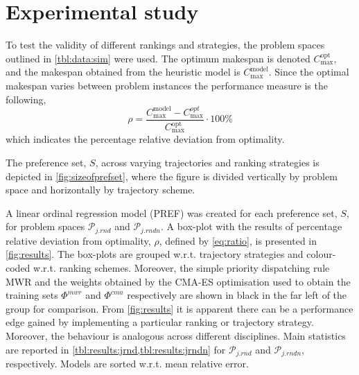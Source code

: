 \documentclass[smallextended]{llncs}
\begin{document}
\section{Experimental study}\label{sec:expr}
To test the validity of different rankings and strategies, the problem spaces outlined in \cref{tbl:data:sim} were used. The optimum makespan is denoted 
$C_{\max}^{\text{opt}}$, and the makespan obtained from the heuristic model is $C_{\max}^{\text{model}}$. Since 
the optimal makespan varies between problem instances the performance measure is the following, 
\begin{equation}\label{eq:ratio}\rho=\frac{C_{\max}^{\text{model}}-C_{\max}^{opt}}{C_{\max}^{\text{opt}}}\cdot 
100\%\end{equation}
which indicates the percentage relative deviation from optimality. 

The preference set, $S$, across varying trajectories and ranking strategies is depicted in \cref{fig:sizeofprefset}, where the figure is divided vertically by problem space and horizontally by trajectory scheme.
 
A linear ordinal regression model (PREF) was created for each preference set, $S$, for problem spaces $\mathcal{P}_{j.rnd}$ and $\mathcal{P}_{j.rndn}$. A box-plot with the results of percentage relative deviation from optimality, $\rho$, defined by \cref{eq:ratio}, is presented in \cref{fig:results}. The box-plots are grouped w.r.t. trajectory strategies and colour-coded w.r.t. ranking schemes. 
Moreover, the simple priority dispatching rule MWR and the weights obtained by the CMA-ES optimisation used to obtain the training sets $\Phi^{mwr}$ and $\Phi^{cma}$ respectively are shown in black in the far left of the group for comparison.
From \cref{fig:results} it is apparent there can be a performance edge gained by implementing a particular ranking or trajectory strategy. Moreover, the behaviour is analogous across different disciplines. 
Main statistics are reported in \cref{tbl:results:jrnd,tbl:results:jrndn} for $\mathcal{P}_{j.rnd}$ and $\mathcal{P}_{j.rndn}$, respectively. Models are sorted w.r.t. mean relative error.
\end{document}

